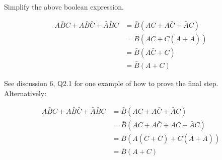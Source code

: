 \begin{blocksection}
\question

Simplify the above boolean expression.
\begin{solution}[0.7in]

\begin{equation}
\begin{split}
A\bar{B}C + A\bar{B}\bar{C} + \bar{A}\bar{B}C &= \bar{B}(AC + A\bar{C} + \bar{A}C) \\
&= \bar{B}(A\bar{C} + C(A + \bar{A})) \\
&= \bar{B}(A\bar{C} + C) \\
&= \bar{B}(A + C)
\end{split}
\end{equation}

See discussion 6, Q2.1 for one example of how to prove the final step. Alternatively:

\begin{equation}
\begin{split}
A\bar{B}C + A\bar{B}\bar{C} + \bar{A}\bar{B}C &= \bar{B}(AC + A\bar{C} + \bar{A}C) \\
&= \bar{B}(AC + A\bar{C} + AC + \bar{A}C) \\
&= \bar{B}(A(C + \bar{C}) + C(A + \bar{A})) \\
&= \bar{B}(A + C)
\end{split}
\end{equation}

\end{solution}

\end{blocksection}